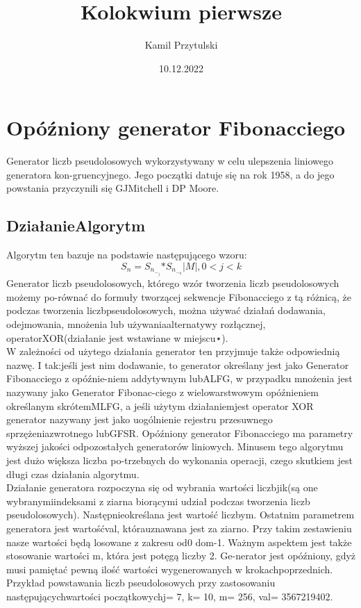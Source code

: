 \documentclass[12pt, letterpaper, titlepage]{article}
\title{Kolokwium pierwsze }
\author{Kamil Przytulski}
\date {10.12.2022}
\begin{document}
\maketitle
\newpage
\section{Opóźniony generator Fibonacciego}
Generator liczb pseudolosowych wykorzystywany w celu ulepszenia liniowego generatora kon-gruencyjnego. Jego początki datuje się na rok 1958, a do jego powstania przyczynili się GJMitchell i DP Moore.
\subsection{DziałanieAlgorytm}
Algorytm ten bazuje na podstawie następującego wzoru:
$$ {{S_n}={S_n_-_j}{*S_n_-_k}{|M|},{0< j < k}} $$
\newline
Generator liczb pseudolosowych, którego wzór tworzenia liczb pseudolosowych możemy po-równać do formuły tworzącej sekwencje Fibonacciego z tą różnicą, że podczas tworzenia liczbpseudolosowych, można używać działań dodawania, odejmowania, mnożenia lub używaniaalternatywy rozłącznej, operatorXOR(działanie jest wstawiane w miejscu⋆).
\\

W zależności od użytego działania generator ten przyjmuje także odpowiednią nazwę. I tak:jeśli jest nim dodawanie, to generator określany jest jako Generator Fibonacciego z opóźnie-niem addytywnym lubALFG, w przypadku mnożenia jest nazywany jako Generator Fibonac-ciego z wielowarstwowym opóźnieniem określanym skrótemMLFG, a jeśli użytym działaniemjest operator XOR generator nazywany jest jako uogólnienie rejestru przesuwnego sprzężeniazwrotnego lubGFSR. Opóźniony generator Fibonacciego ma parametry wyższej jakości odpozostałych generatorów liniowych. Minusem tego algorytmu jest dużo większa liczba po-trzebnych do wykonania operacji, czego skutkiem jest długi czas działania algorytmu.
\\

Działanie generatora rozpoczyna się od wybrania wartości liczbjik(są one wybranymiindeksami z ziarna biorącymi udział podczas tworzenia liczb pseudolosowych). Następnieokreślana jest wartość liczbym. Ostatnim parametrem generatora jest wartośćval, którauznawana jest za ziarno. Przy takim zestawieniu nasze wartości będą losowane z zakresu od0 dom-1. Ważnym aspektem jest także stosowanie wartości m, która jest potęgą liczby 2. Ge-nerator jest opóźniony, gdyż musi pamiętać pewną ilość wartości wygenerowanych w krokachpoprzednich. Przykład powstawania liczb pseudolosowych przy zastosowaniu następującychwartości początkowychj= 7, k= 10, m= 256, val= 3567219402.
\end{document}

